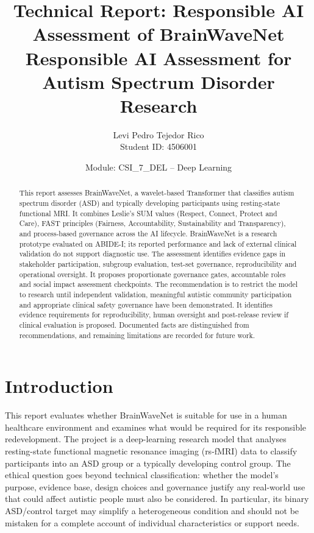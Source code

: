 \documentclass[11pt,a4paper]{article}
\title{\textbf{Technical Report: Responsible AI Assessment of BrainWaveNet}\\
\large Responsible AI Assessment for Autism Spectrum Disorder Research}
\author{Levi Pedro Tejedor Rico\\Student ID: 4506001}
\date{Module: CSI\_7\_DEL -- Deep Learning}
\begin{document}
\maketitle

\begin{abstract}
This report assesses BrainWaveNet, a wavelet-based Transformer that classifies autism spectrum disorder (ASD) and typically developing participants using resting-state functional MRI. It combines Leslie's SUM values (Respect, Connect, Protect and Care), FAST principles (Fairness, Accountability, Sustainability and Transparency), and process-based governance across the AI lifecycle. BrainWaveNet is a research prototype evaluated on ABIDE-I; its reported performance and lack of external clinical validation do not support diagnostic use. The assessment identifies evidence gaps in stakeholder participation, subgroup evaluation, test-set governance, reproducibility and operational oversight. It proposes proportionate governance gates, accountable roles and social impact assessment checkpoints. The recommendation is to restrict the model to research until independent validation, meaningful autistic community participation and appropriate clinical safety governance have been demonstrated. It identifies evidence requirements for reproducibility, human oversight and post-release review if clinical evaluation is proposed. Documented facts are distinguished from recommendations, and remaining limitations are recorded for future work.
\end{abstract}

\tableofcontents
\newpage

\section{Introduction}
This report evaluates whether BrainWaveNet is suitable for use in a human healthcare environment and examines what would be required for its responsible redevelopment. The project is a deep-learning research model that analyses resting-state functional magnetic resonance imaging (rs-fMRI) data to classify participants into an ASD group or a typically developing control group. The ethical question goes beyond technical classification: whether the model's purpose, evidence base, design choices and governance justify any real-world use that could affect autistic people must also be considered. In particular, its binary ASD/control target may simplify a heterogeneous condition and should not be mistaken for a complete account of individual characteristics or support needs.
\end{document}
